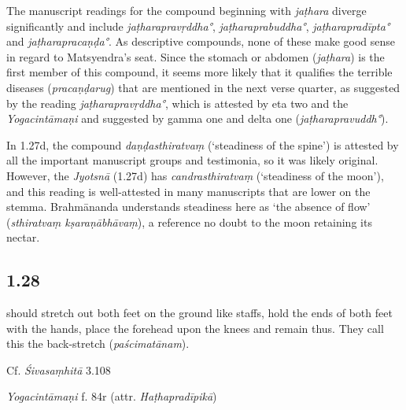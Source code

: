 \begin{ekdosis}
\begin{philcomm}[hp01_027]
The manuscript readings for the compound beginning with \emph{jaṭhara} diverge significantly and include \emph{jaṭharapravṛddha°}, \emph{jaṭharaprabuddha°}, \emph{jaṭharapradīpta°} and \emph{jaṭharapracaṇḍa°}. As descriptive compounds, none of these make good sense in regard to Matsyendra's seat. Since the stomach or abdomen (\emph{jaṭhara}) is the first member of this compound, it seems more likely that it qualifies the terrible diseases (\emph{pracaṇḍarug}) that are mentioned in the next verse quarter, as suggested by the reading \emph{jaṭharapravṛddha°}, which is attested by eta two and the \textit{Yogacintāmaṇi} and suggested by gamma one and delta one (\emph{jaṭharapravuddh°}).

In 1.27d, the compound \emph{daṇḍasthiratvaṃ} (`steadiness of the spine') is attested by all the important manuscript groups and testimonia, so it was likely original. However, the \emph{Jyotsnā} (1.27d) has \emph{candrasthiratvaṃ} (`steadiness of the moon'), and this reading is well-attested in many manuscripts that are lower on the stemma. Brahmānanda understands steadiness here as `the absence of flow' (\emph{sthiratvaṃ kṣaraṇābhāvaṃ}), a reference no doubt to the moon retaining its nectar.
\end{philcomm}

\subsection*{1.28}
\begin{translation} should stretch out both feet on the ground like staffs, hold the ends of both feet with the hands, place the forehead upon the knees and remain thus. They call this the back-stretch (\emph{paścimatānam}).
\end{translation}

\begin{sources}[hp01_028]
Cf. \emph{Śivasaṃhitā} 3.108

\begin{versinnote}
\end{versinnote}

\end{sources}

\begin{testimonia}[hp01_028]
\emph{Yogacintāmaṇi} f. 84r (attr. \emph{Haṭhapradīpikā})


\end{testimonia}
\end{ekdosis}
